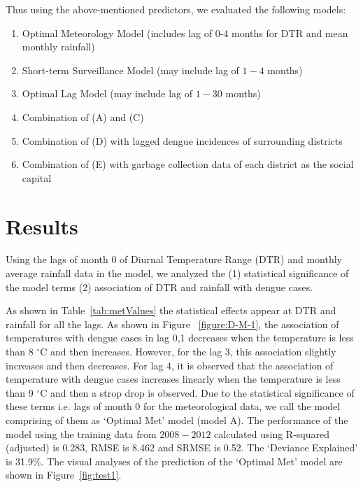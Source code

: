 \documentclass{bmcart}
\begin{document}
Thus using the above-mentioned predictors, we evaluated the following models: 
\begin{enumerate}[label=(\Alph*)]
	\item Optimal Meteorology Model (includes lag of 0-4 months for DTR and mean monthly rainfall)
	\item Short-term Surveillance Model (may include lag of $1-4$ months)
	\item Optimal Lag Model (may include lag of $1-30$ months)
	\item Combination of (A) and (C)
	\item Combination of (D) with lagged dengue incidences of surrounding districts 
	\item  Combination of (E) with garbage collection data of each district as the social capital 
\end{enumerate}



\section{Results} \label{results}


Using the lags of month 0 of Diurnal Temperature Range (DTR) and monthly average rainfall data in the model, we analyzed the (1) statistical significance of the model terms (2) association of DTR and rainfall with dengue cases. 

As shown in Table~\ref{tab:metValues} the statistical effects appear at DTR and rainfall for all the lags. As shown in Figure ~\ref{figure:D-M-1}, the association of temperatures with dengue cases in lag 0,1 decreases when the temperature is less than 8 $^{\circ}$C and then increases. However, for the lag 3, this association slightly increases and then decreases. For lag 4, it is observed that the association of temperature with dengue cases increases linearly when the temperature is less than 9 $^{\circ}$C  and then a strop drop is observed. Due to the statistical significance of these terms i.e. lags of month 0 for the meteorological data, we call the model comprising of them as `Optimal Met' model (model A).  The performance of the model using the training data from $2008-2012$ calculated using R-squared (adjusted) is 0.283, RMSE is 8.462 and SRMSE is 0.52. The `Deviance Explained' is 31.9\%. The visual analyses of the prediction of the `Optimal Met' model are shown in Figure~\ref{fig:test1}. 
\end{document}
